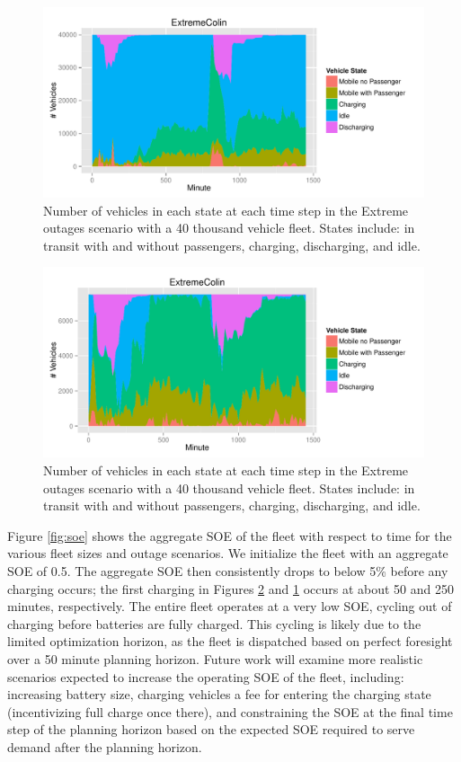 \documentclass[journal]{IEEEtran}
\begin{document}
\begin{figure}[!htbp]
  \includegraphics[width=\linewidth]{plots/states-area-40k.pdf}
  \caption{Number of vehicles in each state at each time step in the Extreme outages scenario with a 40 thousand vehicle fleet. States include: in transit with and without passengers, charging, discharging, and idle.}
  \label{fig:time_extreme_40k}
\end{figure}

\begin{figure}[!htbp]
  \includegraphics[width=\linewidth]{plots/states-area-7500.pdf}
  \caption{Number of vehicles in each state at each time step in the Extreme outages scenario with a 40 thousand vehicle fleet. States include: in transit with and without passengers, charging, discharging, and idle.}
  \label{fig:time_extreme_7500}
\end{figure}

Figure \ref{fig:soe} shows the aggregate SOE of the fleet with respect to time for the various fleet sizes and outage scenarios. We initialize the fleet with an aggregate SOE of 0.5. The aggregate SOE then consistently drops to below 5\% before any charging occurs; the first charging in Figures \ref{fig:time_extreme_7500} and \ref{fig:time_extreme_40k} occurs at about 50 and 250 minutes, respectively. The entire fleet operates at a very low SOE, cycling out of charging before batteries are fully charged. This cycling is likely due to the limited optimization horizon, as the fleet is dispatched based on perfect foresight over a 50 minute planning horizon. Future work will examine more realistic scenarios expected to increase the operating SOE of the fleet, including: increasing battery size, charging vehicles a fee for entering the charging state (incentivizing full charge once there), and constraining the SOE at the final time step of the planning horizon based on the expected SOE required to serve demand after the planning horizon.
\end{document}
